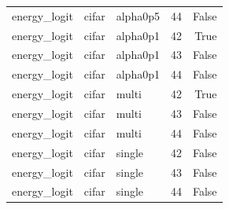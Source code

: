 \begin{tabular}{lllrr}
energy\_logit & cifar & alpha0p5 & 44 & False \\
energy\_logit & cifar & alpha0p1 & 42 & True \\
energy\_logit & cifar & alpha0p1 & 43 & False \\
energy\_logit & cifar & alpha0p1 & 44 & False \\
energy\_logit & cifar & multi & 42 & True \\
energy\_logit & cifar & multi & 43 & False \\
energy\_logit & cifar & multi & 44 & False \\
energy\_logit & cifar & single & 42 & False \\
energy\_logit & cifar & single & 43 & False \\
energy\_logit & cifar & single & 44 & False \\
\bottomrule
\end{tabular}
